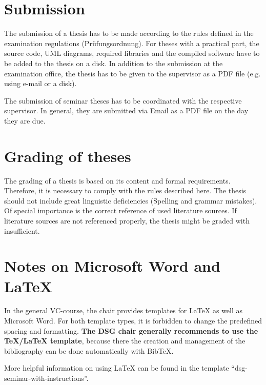 \newpage
\section{Submission}

The submission of a thesis has to be made according to the rules defined in the examination regulations (Prüfungsordnung).
For theses with a practical part, the source code, UML diagrams, required libraries and the compiled software have to be added to the thesis on a disk.
In addition to the submission at the examination office, the thesis has to be given to the supervisor as a PDF file (e.g. using e-mail or a disk).

The submission of seminar theses has to be coordinated with the respective supervisor.
In general, they are submitted via Email as a PDF file on the day they are due.

\section{Grading of theses}

The grading of a thesis is based on its content and formal requirements.
Therefore, it is necessary to comply with the rules described here.
The thesis should not include great linguistic deficiencies (Spelling and grammar mistakes).
Of special importance is the correct reference of used literature sources.
If literature sources are not referenced properly, the thesis might be graded with insufficient.


\section{Notes on Microsoft Word and \LaTeX}

In the general VC-course, the chair provides templates for LaTeX as well as Microsoft Word.
For both template types, it is forbidden to change the predefined spacing and formatting.
\textbf{The DSG chair generally recommends to use the TeX/LaTeX template}, because there the creation and management of the bibliography can be done automatically with BibTeX.

More helpful information on using LaTeX can be found in the template "`dsg-seminar-with-instructions"'.
%
